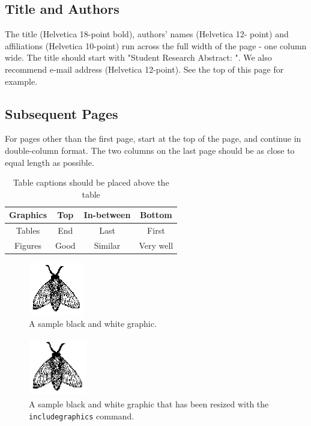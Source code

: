 \documentclass[sigconf]{acmart}
\begin{document}
\subsection*{Title and Authors}
The title (Helvetica 18-point bold), authors' names (Helvetica 12-
point) and affiliations (Helvetica 10-point) run across the full
width of the page - one column wide. The title should start with
"Student Research Abstract: ". We also recommend e-mail
address (Helvetica 12-point). See the top of this page for example.

\subsection*{Subsequent Pages}
For pages other than the first page, start at the top of the page, and
continue in double-column format. The two columns on the last
page should be as close to equal length as possible.

\begin{table}[h]
\caption{Table captions should be placed above the table}
\begin{tabular}{|c|c|c|c|}
\hline
Graphics & Top & In-between & Bottom \\
\hline
Tables & End & Last & First \\
\hline
Figures & Good & Similar & Very well \\
\hline
\end{tabular}
\end{table}

\begin{figure}
\includegraphics{fly}
\caption{A sample black and white graphic.}
\end{figure}

\begin{figure}
\includegraphics[height=1in, width=1in]{fly}
\caption{A sample black and white graphic
that has been resized with the \texttt{includegraphics} command.}
\end{figure}
\end{document}

